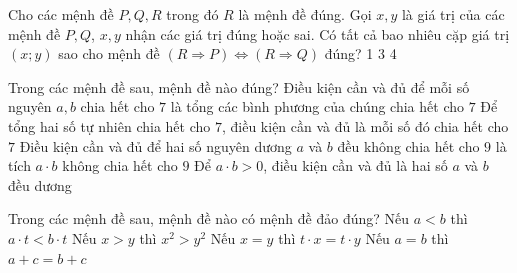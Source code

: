 \begin{ex}%
	Cho các mệnh đề $P,Q,R$ trong đó $R$ là mệnh đề đúng. Gọi $x,y$ là  giá trị của các mệnh đề $P,Q$,
	$x,y$ nhận các giá trị đúng hoặc sai. Có  tất cả bao nhiêu cặp giá trị $(x;y)$ sao cho
	mệnh đề $(R \Rightarrow  P) \Leftrightarrow (R \Rightarrow Q)$ đúng?
	 \choice
		{1} 
		{}
		{3} 
		{4} 
\end{ex}

\begin{ex}%
	Trong  các mệnh đề sau, mệnh đề nào đúng?
	\choice 
		{ \True Điều kiện cần và đủ để mỗi số nguyên $a, b$ chia hết cho $7$ là tổng các bình phương của  chúng chia hết cho $7$}
		{Để tổng hai số tự nhiên chia hết cho $7$, điều kiện cần và  đủ là mỗi số đó chia hết cho $7$ }
		{Điều kiện cần và đủ để hai số nguyên dương  $a$ và $b$ đều không chia hết cho $9$ là tích $a\cdot b$ không chia hết cho $9$}
		{Để $a\cdot b >0$, điều kiện cần và đủ là hai số $a$ và $b$  đều dương}
\end{ex}

\begin{ex}%
	Trong các mệnh đề sau, mệnh đề nào có  mệnh đề đảo đúng?
	\choice 
		{Nếu $a<b$ thì  $a\cdot t<b\cdot t$}
		{Nếu $x>y$  thì $x^2>y^2$}
		{Nếu $x=y$ thì  $t\cdot x=t\cdot y$}
		{\True  Nếu $a=b$ thì $a+c=b+c$}
\end{ex}

